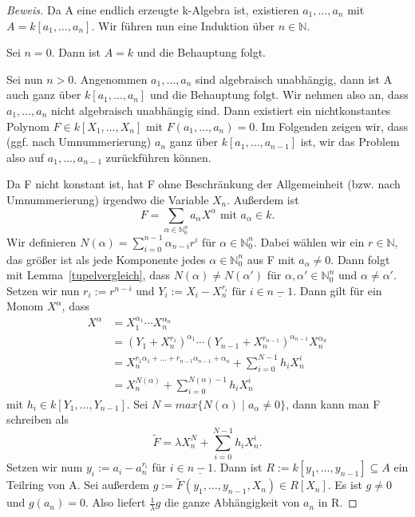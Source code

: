 \documentclass{article}
\begin{document}
	\begin{proof}[Beweis]
	Da A eine endlich erzeugte k-Algebra ist, existieren \(a_1,\ldots,a_n\) mit
	\(A = k[a_1,\ldots,a_n]\). Wir führen nun eine Induktion
	über \(n \in \mathbb{N}\).

	Sei \(n=0\). Dann ist \(A=k\) und die Behauptung folgt.

	Sei nun \(n > 0\). Angenommen \(a_1,\ldots,a_n\) sind algebraisch unabhängig,
	dann ist A auch ganz über \(k[a_1,\ldots,a_n]\) und die Behauptung folgt.
	Wir nehmen also an, dass \(a_1,\ldots,a_n\) nicht algebraisch unabhängig sind.
	Dann existiert ein nichtkonstantes Polynom \(F \in  k[X_1,\ldots,X_n]\)	mit
	\(F(a_1,\ldots,a_n) = 0\).
	Im Folgenden zeigen wir, dass (ggf. nach Umnummerierung) \(a_n\) ganz über
	\(k[a_1,\ldots,a_{n-1}]\) ist, wir das Problem also auf \(a_1,\ldots,a_{n-1}\)
	zurückführen können.

	Da F nicht konstant ist, hat F ohne Beschränkung der Allgemeinheit (bzw.
	nach Umnummerierung) irgendwo die Variable \(X_n\). Außerdem ist
	\begin{displaymath} F = \sum_{\alpha \in \mathbb{N}^n_0} a_{\alpha}X^{\alpha}
	\text{ mit } a_{\alpha}\in k.\end{displaymath}
	Wir definieren \(N(\alpha) = \sum^{n-1}_{i=0} \alpha_{n-i}r^i\) für
	\(\alpha \in \mathbb{N}^n_0\). Dabei wählen wir ein \(r \in \mathbb{N}\),
	das größer ist als jede Komponente jedes \(\alpha \in \mathbb{N}^n_0\) aus F
	mit \(a_{\alpha} \neq 0\). Dann folgt mit Lemma~\ref{tupelvergleich}, dass
	\(N(\alpha) \neq N(\alpha')\) für \(\alpha, \alpha' \in \mathbb{N}^n_0\) und
	\(\alpha \neq \alpha'\). Setzen wir nun
	\( r_i := r^{n-i} \text{ und } Y_i := X_i - X_n^{r_i}
	\text{ für } i \in \underline{n-1}\). Dann gilt für ein Monom \(X^{\alpha}\),
	dass \begin{align*}
	X^{\alpha} &= X_1^{\alpha_1}\cdots X_{n}^{\alpha_n} \\
	&= (Y_1 + X_n^{r_1})^{\alpha_1} \cdots (Y_{n-1} + X_n^{r_{n-1}})^{\alpha_{n-1}}X_n^{\alpha_n} \\
	&= X_n^{r_1\alpha_1 + \ldots + r_{n-1}\alpha_{n-1} + \alpha_n} + \sum_{i=0}^{N-1} h_iX_n^i \\
	&= X_n^{N(\alpha)} + \sum_{i=0}^{N(\alpha)-1} h_iX_n^i
	\end{align*}
	mit \(h_i \in k[Y_1, \ldots, Y_{n-1}]\). Sei \(N = max\{N(\alpha)\;|\;a_{\alpha}
	\neq 0\}\), dann kann man F schreiben als
	\begin{displaymath} \tilde{F} = \lambda X_n^N + \sum_{i=0}^{N-1} h_iX_n^i.
	\end{displaymath}
	Setzen wir num \(y_i := a_i - a_n^{r_i}\) für \(i \in \underline{n-1}\).
	Dann ist \(R := k[y_1,\ldots,y_{n-1}] \subseteq A\) ein Teilring von A.
	Sei außerdem \(g := \tilde{F}(y_1,\ldots,y_{n-1},X_n) \in R[X_n]\).
	Es ist \(g \neq 0\) und \(g(a_n) = 0\). Also liefert \(\frac{1}{\lambda}g\)
	die ganze Abhängigkeit von \(a_n\) in R.


\end{proof}
\end{document}
